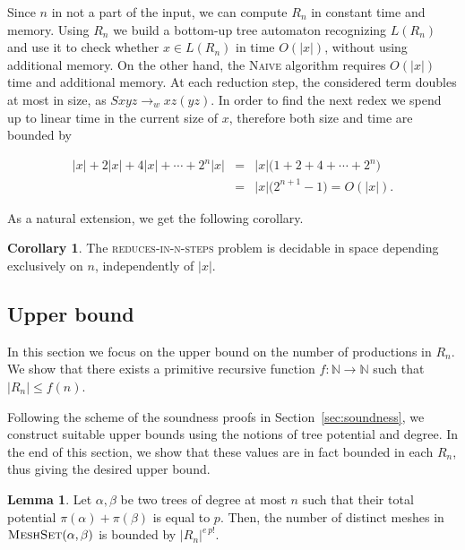 \documentclass[11pt,a4paper]{amsart}
\theoremstyle{definition}
\newtheorem{lemma}[theorem]{Lemma}
\newtheorem{cor}[theorem]{Corollary}
\newcommand{\MeshSet}[2]{\textsc{MeshSet}(#1,#2)}
\newcommand{\potential}[1]{\pi(#1)}
\begin{document}
Since $n$ in not a part of the input, we can compute $R_n$ in constant time and memory. Using $R_n$ we build a bottom-up tree automaton recognizing $L(R_n)$~\cite{tata2007} and use it to check whether $x \in L(R_n)$ in time
$O(|x|)$, without using additional memory. On the other hand, the \textsc{Naive} algorithm requires $O(|x|)$ time and additional memory. At each reduction step, the considered term doubles at most in size, as $S x y z \to_w x z (y z)$. In order to find the next redex we spend up to linear time in the current size of $x$, therefore both size and time are bounded by

\begin{eqnarray*}
|x| + 2 |x| + 4 |x| + \cdots + 2^n |x| &=& |x| \Big(1 + 2 + 4 + \cdots + 2^n \Big) \\
 &=& |x| \Big( 2^{n+1} - 1 \Big) = O(|x|).
\end{eqnarray*}

As a natural extension, we get the following corollary.
\begin{cor}
        The \textsc{reduces-in-n-steps} problem is decidable in space
        depending exclusively on $n$, independently of $|x|$.
\end{cor}

\subsection{Upper bound}\label{sec:upper-bound}
In this section we focus on the upper bound on the number of productions in $R_n$. We show that there exists a primitive recursive function $f : \mathbb{N} \to \mathbb{N}$ such that $|R_n| \leq f(n)$.

Following the scheme of the soundness proofs in Section~\ref{sec:soundness}, we construct suitable upper bounds using the notions of tree potential and degree. In the end of this section, we show that these values are in fact bounded in each $R_n$, thus giving the desired upper bound.

\begin{lemma}\label{lem-meshset-upperbound}
    Let $\alpha,\beta$ be two trees of degree at most $n$ such that their total potential $\potential{\alpha} + \potential{\beta}$ is equal to $p$. Then, the number of distinct meshes in $\MeshSet{\alpha}{\beta}$ is bounded by ${|R_n|}^{e\, p!}$.
\end{lemma}
\end{document}
